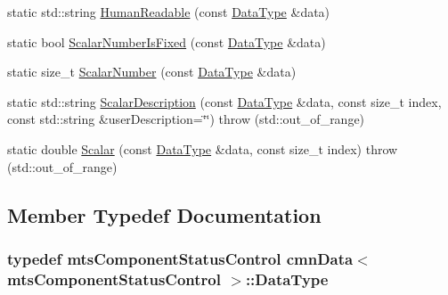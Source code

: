 \begin{DoxyCompactItemize}
\item 
static std\+::string \hyperlink{classcmn_data_3_01mts_component_status_control_01_4_ae8db85bc0e31ad181a640cd94d50cda9}{Human\+Readable} (const \hyperlink{classcmn_data_3_01mts_component_status_control_01_4_a568a9683fdee2127ddf90cb856733c3c}{Data\+Type} \&data)
\item 
static bool \hyperlink{classcmn_data_3_01mts_component_status_control_01_4_a233898c0380b6b0057b16b9de5d4833e}{Scalar\+Number\+Is\+Fixed} (const \hyperlink{classcmn_data_3_01mts_component_status_control_01_4_a568a9683fdee2127ddf90cb856733c3c}{Data\+Type} \&data)
\item 
static size\+\_\+t \hyperlink{classcmn_data_3_01mts_component_status_control_01_4_adbadcd359d2592bec37b5d6f4860e6b7}{Scalar\+Number} (const \hyperlink{classcmn_data_3_01mts_component_status_control_01_4_a568a9683fdee2127ddf90cb856733c3c}{Data\+Type} \&data)
\item 
static std\+::string \hyperlink{classcmn_data_3_01mts_component_status_control_01_4_a49729bffd473f1b7636ee662ca44493d}{Scalar\+Description} (const \hyperlink{classcmn_data_3_01mts_component_status_control_01_4_a568a9683fdee2127ddf90cb856733c3c}{Data\+Type} \&data, const size\+\_\+t index, const std\+::string \&user\+Description=\char`\"{}\char`\"{})  throw (std\+::out\+\_\+of\+\_\+range)
\item 
static double \hyperlink{classcmn_data_3_01mts_component_status_control_01_4_a4c88a2f5544b80c379f301682fee827f}{Scalar} (const \hyperlink{classcmn_data_3_01mts_component_status_control_01_4_a568a9683fdee2127ddf90cb856733c3c}{Data\+Type} \&data, const size\+\_\+t index)  throw (std\+::out\+\_\+of\+\_\+range)
\end{DoxyCompactItemize}


\subsection{Member Typedef Documentation}
\hypertarget{classcmn_data_3_01mts_component_status_control_01_4_a568a9683fdee2127ddf90cb856733c3c}{}
\subsubsection[{Data\+Type}]{\setlength{\rightskip}{0pt plus 5cm}typedef {\bf mts\+Component\+Status\+Control} {\bf cmn\+Data}$<$ {\bf mts\+Component\+Status\+Control} $>$\+::{\bf Data\+Type}}\label{classcmn_data_3_01mts_component_status_control_01_4_a568a9683fdee2127ddf90cb856733c3c}


